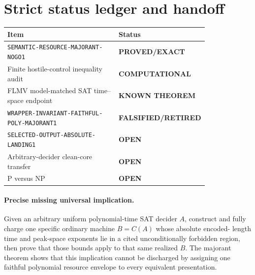 \documentclass[11pt]{article}
\newcommand{\OPEN}{\textbf{OPEN}}
\newcommand{\EXACT}{\textbf{PROVED/EXACT}}
\newcommand{\KNOWN}{\textbf{KNOWN THEOREM}}
\newcommand{\COMP}{\textbf{COMPUTATIONAL}}
\newcommand{\RETIRED}{\textbf{FALSIFIED/RETIRED}}
\begin{document}
\section{Strict status ledger and handoff}

\begin{center}
\begin{tabular}{p{0.55\linewidth}p{0.26\linewidth}}
\toprule
Item & Status \\
\midrule
\texttt{SEMANTIC-RESOURCE-MAJORANT-NOGO1} & \EXACT \\
Finite hostile-control inequality audit & \COMP \\
FLMV model-matched SAT time--space endpoint & \KNOWN \\
\texttt{WRAPPER-INVARIANT-FAITHFUL-POLY-MAJORANT1} & \RETIRED \\
\texttt{SELECTED-OUTPUT-ABSOLUTE-LANDING1} & \OPEN \\
Arbitrary-decider clean-core transfer & \OPEN \\
P versus NP & \OPEN \\
\bottomrule
\end{tabular}
\end{center}

\paragraph{Precise missing universal implication.}
Given an arbitrary uniform polynomial-time SAT decider $A$, construct and
fully charge one specific ordinary machine $B=C(A)$ whose absolute encoded-
length time and peak-space exponents lie in a cited unconditionally forbidden
region, then prove that those bounds apply to that same realized $B$.  The
majorant theorem shows that this implication cannot be discharged by assigning
one faithful polynomial resource envelope to every equivalent presentation.
\end{document}

